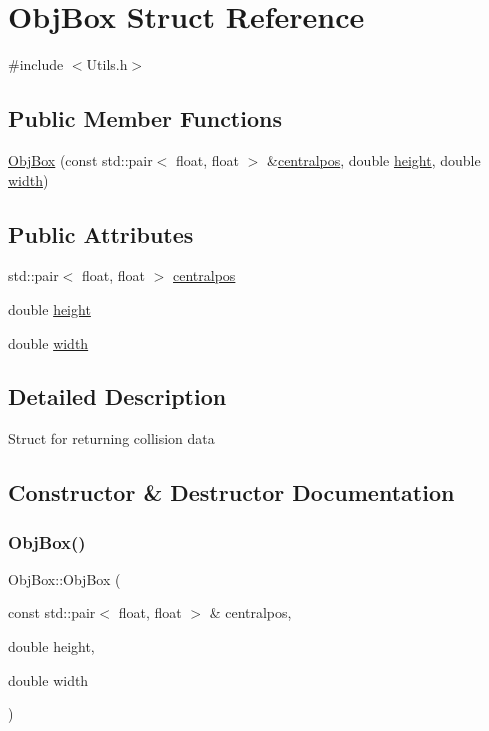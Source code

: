 \hypertarget{structObjBox}{}\section{Obj\+Box Struct Reference}
\label{structObjBox}


{\ttfamily \#include $<$Utils.\+h$>$}

\subsection*{Public Member Functions}
\begin{DoxyCompactItemize}
\item 
\hyperlink{structObjBox_ae82c9aa8ac2715dc917bfa67eb57eb26}{Obj\+Box} (const std\+::pair$<$ float, float $>$ \&\hyperlink{structObjBox_ab19f0fb6939bdfe0c2100859cf3f63e9}{centralpos}, double \hyperlink{structObjBox_a392ed35e68724580f1f16bb25e73f599}{height}, double \hyperlink{structObjBox_a8fb516e7dc226bee6baf1af53d9376d9}{width})
\end{DoxyCompactItemize}
\subsection*{Public Attributes}
\begin{DoxyCompactItemize}
\item 
std\+::pair$<$ float, float $>$ \hyperlink{structObjBox_ab19f0fb6939bdfe0c2100859cf3f63e9}{centralpos}
\item 
double \hyperlink{structObjBox_a392ed35e68724580f1f16bb25e73f599}{height}
\item 
double \hyperlink{structObjBox_a8fb516e7dc226bee6baf1af53d9376d9}{width}
\end{DoxyCompactItemize}


\subsection{Detailed Description}
Struct for returning collision data 

\subsection{Constructor \& Destructor Documentation}
\mbox{\label{structObjBox_ae82c9aa8ac2715dc917bfa67eb57eb26}} 
\subsubsection{\texorpdfstring{Obj\+Box()}{ObjBox()}}
{\footnotesize\ttfamily Obj\+Box\+::\+Obj\+Box (\begin{DoxyParamCaption}\item[{const std\+::pair$<$ float, float $>$ \&}]{centralpos,  }\item[{double}]{height,  }\item[{double}]{width }\end{DoxyParamCaption})\hspace{0.3cm}{\ttfamily [inline]}}


